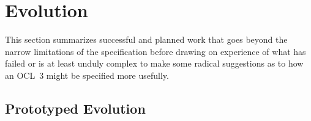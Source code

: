 \documentclass{jot}
\begin{document}





\section{Evolution}\label{Evolution}

This section summarizes successful and planned work that goes beyond the narrow limitations of the specification before drawing on experience of what has failed or is at least unduly complex to make some radical suggestions as to how an OCL~3 might be specified more usefully.

\subsection{Prototyped Evolution}
\end{document}
